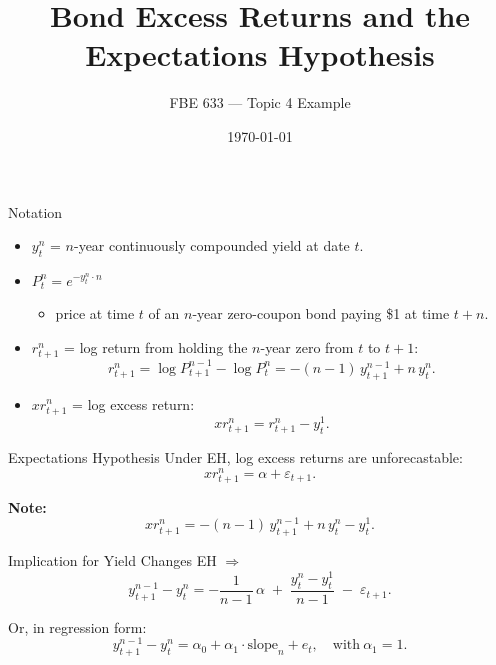 \documentclass{beamer}
\title{Bond Excess Returns and the Expectations Hypothesis}
\author{FBE 633 --- Topic 4 Example}
\date{\today}
\begin{document}
\begin{frame}
  \titlepage
\end{frame}

\begin{frame}{Notation}
  \begin{itemize}
    \item $y^n_t$ = $n$-year continuously compounded yield at date $t$.
    \item $P^n_t = e^{-y^n_t \cdot n}$
      \begin{itemize}
        \item price at time $t$ of an $n$-year zero-coupon bond paying \$1 at time $t+n$.
      \end{itemize}
    \item $r^n_{t+1}$ = log return from holding the $n$-year zero from $t$ to $t+1$:
      \begin{equation*}
        r^n_{t+1} = \log P^{n-1}_{t+1} - \log P^n_t
                  = -(n-1)\, y^{n-1}_{t+1} + n\, y^n_t.
      \end{equation*}
    \item $xr^n_{t+1}$ = log excess return:
      \begin{equation*}
        xr^n_{t+1} = r^n_{t+1} - y^1_t.
      \end{equation*}
  \end{itemize}
\end{frame}

\begin{frame}{Expectations Hypothesis}
  Under EH, log excess returns are unforecastable:
  \begin{equation*}
    xr^n_{t+1} = \alpha + \varepsilon_{t+1}.
  \end{equation*}

  \textbf{Note:}
  \begin{equation*}
    xr^n_{t+1} = -(n-1)\, y^{n-1}_{t+1} + n\, y^n_t - y^1_t.
  \end{equation*}
\end{frame}

\begin{frame}{Implication for Yield Changes}
  EH $\Rightarrow$
  \begin{equation*}
    y^{n-1}_{t+1} - y^n_t
      = -\frac{1}{n-1}\,\alpha \;+\; \frac{y^n_t - y^1_t}{n-1} \;-\; \varepsilon_{t+1}.
  \end{equation*}

  \vspace{0.5em}
  Or, in regression form:
  \begin{equation*}
    y^{n-1}_{t+1} - y^n_t = \alpha_0 + \alpha_1 \cdot \text{slope}_n + e_t,
    \quad \text{with}\ \alpha_1 = 1.
  \end{equation*}

  \vspace{0.5em}
  \begin{center}
  \end{center}
\end{frame}
\end{document}
